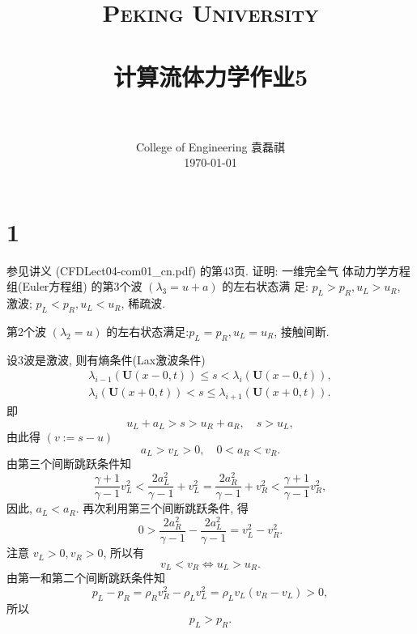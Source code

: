 \documentclass[12pt]{article}
\title{
		\vspace{-1in} 	
		\usefont{OT1}{bch}{b}{n}
		\normalfont \normalsize \textsc{\LARGE Peking University}\\[0.2cm] %
		\horrule{0.5pt} \\[0.2cm]
		\huge \bfseries{计算流体力学作业5} \\[-0.2cm]
		\horrule{2pt} \\[0.2cm]
}
\author{
		\normalfont 								\normalsize
		College of Engineering \quad 2001111690  \quad 袁磊祺\\	\normalsize
        \today
}
\date{}
\begin{document}


\maketitle

\section{1}



参见讲义 (CFDLect04-com01\_cn.pdf) 的第43页. 证明: 一维完全气
体动力学方程组(Euler方程组) 的第3个波 $\left(\lambda_{3}=u+a\right)$ 的左右状态满
足:
$p_{L}>p_{R}, u_{L}>u_{R}$, 激波; $p_{L}<p_{R}, u_{L}<u_{R}$, 稀疏波.

第2个波 $\left(\lambda_{2}=u\right)$ 的左右状态满足:$p_{L}=p_{R}, u_{L}=u_{R}$, 接触间断.

设3波是激波, 则有熵条件(Lax激波条件)
\begin{align}
	\lambda_{i-1}(\boldsymbol{U}(x-0, t)) \leq s<\lambda_{i}(\boldsymbol{U}(x-0, t)), \\
	\lambda_{i}(\boldsymbol{U}(x+0, t))<s \leq \lambda_{i+1}(\boldsymbol{U}(x+0, t)).
\end{align}
即
\begin{equation}
	u_{L}+a_{L}>s>u_{R}+a_{R}, \quad s>u_{L},
\end{equation}
由此得 $(v:=s-u)$
\begin{equation}
	a_{L}>v_{L}>0, \quad 0<a_{R}<v_{R}.
\end{equation}
由第三个间断跳跃条件知
\begin{equation}
	\frac{\gamma+1}{\gamma-1} v_{L}^{2}<\frac{2 a_{L}^{2}}{\gamma-1}+v_{L}^{2}=\frac{2 a_{R}^{2}}{\gamma-1}+v_{R}^{2}<\frac{\gamma+1}{\gamma-1} v_{R}^{2},
\end{equation}
因此, $a_{L}<a_{R} .$
再次利用第三个间断跳跃条件, 得
\begin{equation}
	0>\frac{2 a_{R}^{2}}{\gamma-1}-\frac{2 a_{L}^{2}}{\gamma-1}=v_{L}^{2}-v_{R}^{2}.
\end{equation}
注意 $v_{L}>0, v_{R}>0$, 所以有
\begin{equation}
	v_{L}<v_{R} \Longleftrightarrow u_{L}>u_{R}.
\end{equation}
由第一和第二个间断跳跃条件知
\begin{equation}
	p_{L}-p_{R}=\rho_{R} v_{R}^{2}-\rho_{L} v_{L}^{2}=\rho_{L} v_{L}\left(v_{R}-v_{L}\right)>0,
\end{equation}
所以
\begin{equation}
	p_L>p_R.
\end{equation}
\end{document}
